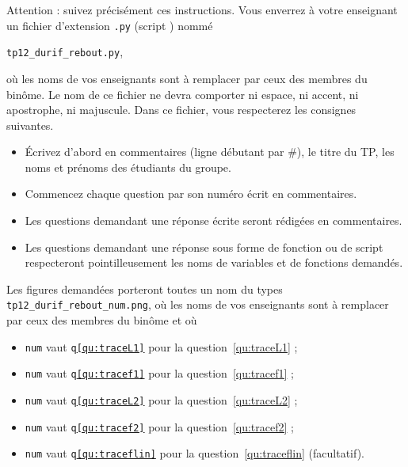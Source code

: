 Attention : suivez précisément ces instructions. Vous enverrez à votre enseignant un fichier d'extension  \texttt{.py} (script \python) nommé
\begin{center}
  \texttt{tp12\_durif\_rebout.py},
\end{center}
où les noms de vos enseignants sont à remplacer par ceux des membres du binôme. Le nom de ce 
fichier ne devra comporter ni espace, ni accent, ni apostrophe, ni majuscule.
Dans ce fichier, vous respecterez les consignes suivantes.
\begin{itemize}
  \item \'Ecrivez d'abord en commentaires (ligne débutant par \#), le titre du TP, les noms et prénoms des étudiants du groupe.
  \item Commencez chaque question par son numéro écrit en commentaires.
  \item Les questions demandant une réponse écrite seront rédigées en commentaires.
  \item Les questions demandant une réponse sous forme de fonction ou de script respecteront pointilleusement les noms de variables et de fonctions demandés.
\end{itemize} 

Les figures demandées porteront toutes un nom du types \texttt{tp12\_durif\_rebout\_num.png}, où les noms de vos enseignants sont à remplacer par ceux des membres du binôme et où
\begin{itemize}
  \item \texttt{num} vaut \texttt{q\ref{qu:traceL1}} pour la question~\ref{qu:traceL1} ;
  \item \texttt{num} vaut \texttt{q\ref{qu:tracef1}} pour la question~\ref{qu:tracef1} ;
  \item \texttt{num} vaut \texttt{q\ref{qu:traceL2}} pour la question~\ref{qu:traceL2} ;
  \item \texttt{num} vaut \texttt{q\ref{qu:tracef2}} pour la question~\ref{qu:tracef2} ;
  \item \texttt{num} vaut \texttt{q\ref{qu:traceflin}} pour la question~\ref{qu:traceflin} (facultatif).
\end{itemize}